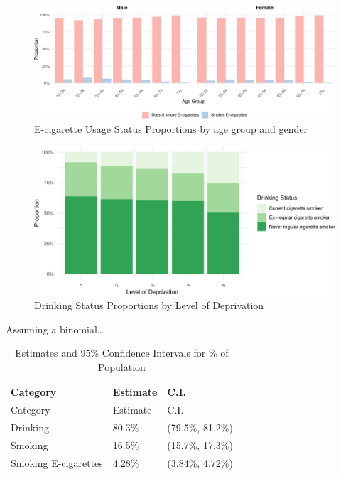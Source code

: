 \documentclass[
  11pt,
]{article}
\begin{document}
\begin{figure}
\centering
\includegraphics{Coursework_files/figure-latex/output e-cigs by age plot-1.pdf}
\caption{E-cigarette Usage Status Proportions by age group and gender}
\end{figure}

\begin{figure}
\centering
\includegraphics{Coursework_files/figure-latex/output deprivation plot-1.pdf}
\caption{Drinking Status Proportions by Level of Deprivation}
\end{figure}

Assuming a binomial\ldots{}

\begin{longtable}[]{@{}lll@{}}
\caption{Estimates and 95\% Confidence Intervals for \% of
Population}\tabularnewline
\toprule\noalign{}
Category & Estimate & C.I. \\
\midrule\noalign{}
\endfirsthead
\toprule\noalign{}
Category & Estimate & C.I. \\
\midrule\noalign{}
\endhead
\bottomrule\noalign{}
\endlastfoot
Drinking & 80.3\% & (79.5\%, 81.2\%) \\
Smoking & 16.5\% & (15.7\%, 17.3\%) \\
Smoking E-cigarettes & 4.28\% & (3.84\%, 4.72\%) \\
\end{longtable}
\end{document}
